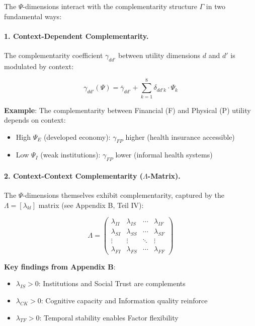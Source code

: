 The $\Psi$-dimensions interact with the complementarity structure $\Gamma$ in 
two fundamental ways:

\paragraph{1. Context-Dependent Complementarity.}

The complementarity coefficient $\gamma_{dd'}$ between utility dimensions $d$ 
and $d'$ is modulated by context:

\begin{equation}
\gamma_{dd'}(\Psi) = \bar{\gamma}_{dd'} + \sum_{k=1}^{8} \delta_{dd'k} \cdot \Psi_k
\label{eq:gamma-psi-modulation}
\end{equation}

\textbf{Example}: The complementarity between Financial (F) and Physical (P) 
utility depends on context:
\begin{itemize}
    \item High $\Psi_E$ (developed economy): $\gamma_{FP}$ higher (health insurance accessible)
    \item Low $\Psi_I$ (weak institutions): $\gamma_{FP}$ lower (informal health systems)
\end{itemize}

\paragraph{2. Context-Context Complementarity ($\Lambda$-Matrix).}

The $\Psi$-dimensions themselves exhibit complementarity, captured by the 
$\Lambda = [\lambda_{kl}]$ matrix (see Appendix B, Teil IV):

\begin{equation}
\Lambda = \begin{pmatrix}
\lambda_{II} & \lambda_{IS} & \cdots & \lambda_{IF} \\
\lambda_{SI} & \lambda_{SS} & \cdots & \lambda_{SF} \\
\vdots & \vdots & \ddots & \vdots \\
\lambda_{FI} & \lambda_{FS} & \cdots & \lambda_{FF}
\end{pmatrix}
\end{equation}

\textbf{Key findings from Appendix B}:
\begin{itemize}
    \item $\lambda_{IS} > 0$: Institutions and Social Trust are complements
    \item $\lambda_{CK} > 0$: Cognitive capacity and Information quality reinforce
    \item $\lambda_{TF} > 0$: Temporal stability enables Factor flexibility
\end{itemize}

